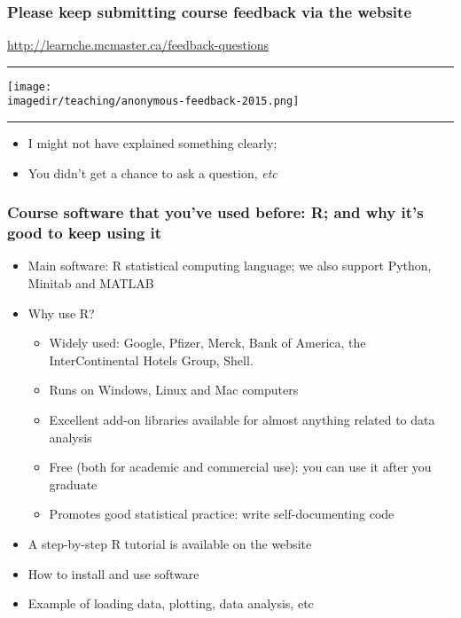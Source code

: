 \begin{frame}\frametitle{Please keep submitting course feedback via the website}
	
	\href{http://learnche.mcmaster.ca/feedback-questions}{http://learnche.mcmaster.ca/feedback-questions}
	\vspace{4pt}
	\hrule
	\begin{center}
		\texttt{[image: \\imagedir/teaching/anonymous-feedback-2015.png]}
	\end{center}
	\hrule
	\begin{itemize}
		\item	I might not have explained something clearly;
		\item	You didn't get a chance to ask a question, \emph{etc}
	\end{itemize}	
\end{frame}

\begin{frame}\frametitle{Course software that you've used before: R; and why it's good to keep using it}
	\begin{itemize}
		\item	Main software: R statistical computing language; we also support Python, Minitab and MATLAB
	\end{itemize}
	
	\begin{itemize}
		\item	Why use R?
		\begin{itemize}
			\item	Widely used: Google, Pfizer, Merck, Bank of America, the InterContinental Hotels Group, Shell.
			\item	Runs on Windows, Linux and Mac computers
			\item	Excellent add-on libraries available for almost anything related to data analysis
			\item	Free (both for academic and commercial use): you can use it after you graduate
			\item	Promotes good statistical practice: write self-documenting code
		\end{itemize}
	\end{itemize}
	
	\begin{itemize}
		\item	A step-by-step R tutorial is available on the website
		\item	How to install and use software
		\item	Example of loading data, plotting, data analysis, etc
	\end{itemize}
\end{frame}

